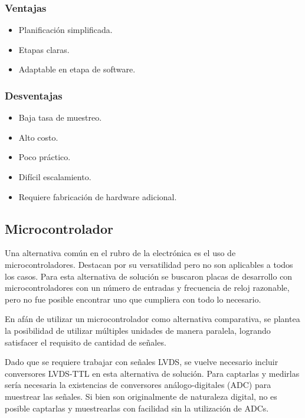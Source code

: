 \subsubsection*{Ventajas}
\begin{itemize}
	\item Planificación simplificada.
	\item Etapas claras.
	\item Adaptable en etapa de software.
\end{itemize}


\subsubsection*{Desventajas}
\begin{itemize}
	\item Baja tasa de muestreo.
	\item Alto costo.
	\item Poco práctico.
	\item Difícil escalamiento.
	\item Requiere fabricación de hardware adicional.
\end{itemize}

\newpage
\subsection{Microcontrolador}
\label{sec:micro}
\par Una alternativa común en el rubro de la electrónica es el uso de microcontroladores. Destacan por su versatilidad pero no son aplicables a todos los casos. Para esta alternativa de solución se buscaron placas de desarrollo con microcontroladores con un número de entradas y frecuencia de reloj razonable, pero no fue posible encontrar uno que cumpliera con todo lo necesario. 
\par En afán de utilizar un microcontrolador como alternativa comparativa, se plantea la posibilidad de utilizar múltiples unidades de manera paralela, logrando satisfacer el requisito de cantidad de señales.

\par Dado que se requiere trabajar con señales LVDS, se vuelve necesario incluir conversores LVDS-TTL en esta alternativa de solución. Para captarlas y medirlas sería necesaria la existencias de conversores análogo-digitales (ADC) para muestrear las señales. Si bien son originalmente de naturaleza digital, no es posible captarlas y muestrearlas con facilidad sin la utilización de ADCs.

